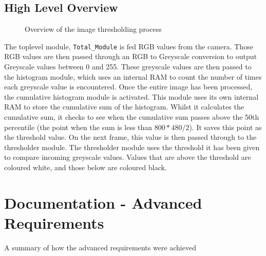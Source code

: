 \documentclass[12pt]{article}
\begin{document}
  
  \subsection{High Level Overview}
  \begin{figure}[H]
    \caption{Overview of the image thresholding process}
    \label{fig:histogram_overview}
  \end{figure}
  
  The toplevel module, \texttt{Total\_Module} is fed RGB values from the camera. Those RGB values are then passed through an RGB to Greyscale conversion to output Greyscale values between 0 and 255. These greyscale values are then passed to the histogram module, which uses an internal RAM to count the number of times each greyscale value is encountered. Once the entire image has been processed, the cumulative histogram module is activated. This module uses its own internal RAM to store the cumulative sum of the histogram. Whilst it calculates the cumulative sum, it checks to see when the cumulative sum passes above the 50th percentile (the point when the sum is less than \(800*480/2\)). It saves this point as the threshold value. On the next frame, this value is then passed through to the thresholder module. The thresholder module uses the threshold it has been given to compare incoming greyscale values. Values that are above the threshold are coloured white, and those below are coloured black.
  
  \section{Documentation - Advanced Requirements}
  A summary of how the advanced requirements were achieved
  
\end{document}
